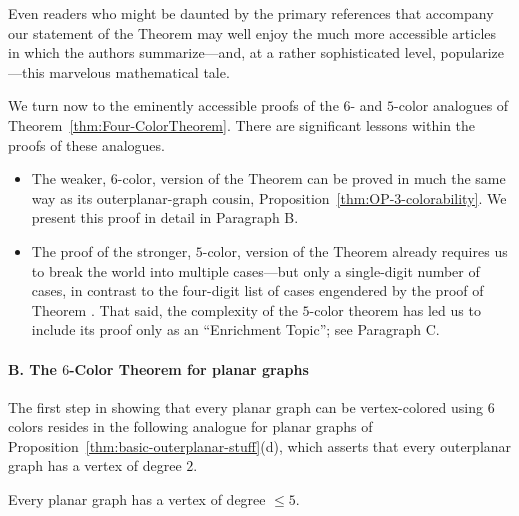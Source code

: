 \smallskip

Even readers who might be daunted by the primary references \cite{AppelH77a,AppelH77b} that accompany our statement of the Theorem may well enjoy the much more accessible articles \cite{AppelH77c,AppelH89} in which the authors summarize---and, at a rather sophisticated level, popularize---this marvelous mathematical tale.

\bigskip

We turn now to the eminently accessible proofs of the $6$- and $5$-color analogues of Theorem~\ref{thm:Four-ColorTheorem}.  There are significant lessons within the proofs of these 
analogues.
\begin{itemize}
\item
The weaker, $6$-color, version of the Theorem can be proved in much the same way as its
outerplanar-graph cousin, Proposition~\ref{thm:OP-3-colorability}.  We
present this proof in detail in Paragraph B.  
\item
The proof of the stronger, $5$-color, version of the Theorem already requires us to break the world into multiple cases---but only a single-digit number of cases, in contrast to the four-digit list of cases engendered by the proof of Theorem \cite{AppelH77a,AppelH77b}.  That said, the complexity of the $5$-color theorem has led us to include its proof only as an ``Enrichment Topic''; see Paragraph C.
\end{itemize}


\paragraph {B. The $6$-Color Theorem for planar graphs}

The first step in showing that every planar graph can be vertex-colored using $6$ colors resides in the following analogue for planar graphs of Proposition~\ref{thm:basic-outerplanar-stuff}(d), which asserts that every outerplanar graph has a vertex of degree $2$.

\begin{lemma}
\label{thm:PlanarGraph-degree5}
Every planar graph has a vertex of degree $\leq 5$.
\end{lemma}

  

